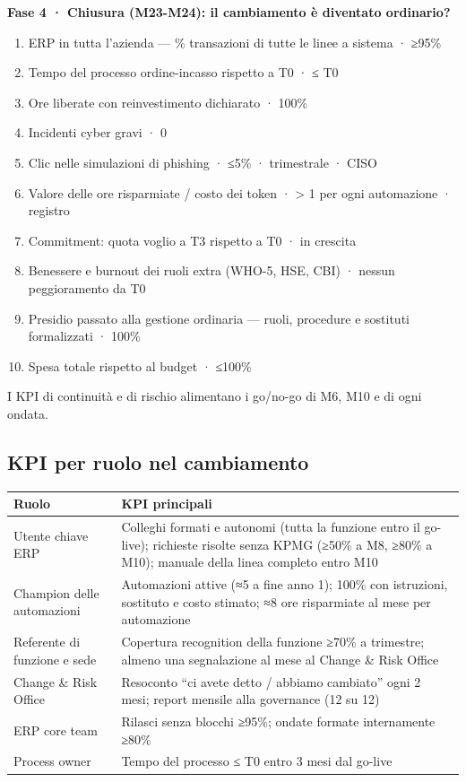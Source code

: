 \documentclass[11pt,a4paper]{article}
\begin{document}
\textbf{Fase 4 · Chiusura (M23-M24): il cambiamento è diventato ordinario?}
\begin{enumerate}
\item ERP in tutta l'azienda — \% transazioni di tutte le linee a sistema · ≥95\%
\item Tempo del processo ordine-incasso rispetto a T0 · ≤ T0
\item Ore liberate con reinvestimento dichiarato · 100\%
\item Incidenti cyber gravi · 0
\item Clic nelle simulazioni di phishing · ≤5\% · trimestrale · CISO
\item Valore delle ore risparmiate / costo dei token · > 1 per ogni automazione · registro
\item Commitment: quota \guillemotleft{}voglio\guillemotright{} a T3 rispetto a T0 · in crescita
\item Benessere e burnout dei ruoli extra (WHO-5, HSE, CBI) · nessun peggioramento da T0
\item Presidio passato alla gestione ordinaria — ruoli, procedure e sostituti formalizzati · 100\%
\item Spesa totale rispetto al budget · ≤100\%
\end{enumerate}

I KPI di continuità e di rischio alimentano i go/no-go di M6, M10 e di ogni ondata.

\subsection{KPI per ruolo nel cambiamento}\label{sec:16.5}

{\small\renewcommand{\arraystretch}{1.25}
\begin{xltabular}{\linewidth}{@{}>{\raggedright\arraybackslash{}\hsize\hspace{0pt}}X>{\raggedright\arraybackslash{}\hsize\hspace{0pt}}X@{}}
\toprule
\textbf{Ruolo} & \textbf{KPI principali} \\
\midrule
\endhead
Utente chiave ERP & Colleghi formati e autonomi (tutta la funzione entro il go-live); richieste risolte senza KPMG (≥50\% a M8, ≥80\% a M10); manuale della linea completo entro M10 \\
Champion delle automazioni & Automazioni attive (≈5 a fine anno 1); 100\% con istruzioni, sostituto e costo stimato; ≈8 ore risparmiate al mese per automazione \\
Referente di funzione e sede & Copertura recognition della funzione ≥70\% a trimestre; almeno una segnalazione al mese al Change \& Risk Office \\
Change \& Risk Office & Resoconto ``ci avete detto / abbiamo cambiato'' ogni 2 mesi; report mensile alla governance (12 su 12) \\
ERP core team & Rilasci senza blocchi ≥95\%; ondate formate internamente ≥80\% \\
Process owner & Tempo del processo ≤ T0 entro 3 mesi dal go-live \\
\bottomrule
\end{xltabular}}
\end{document}

